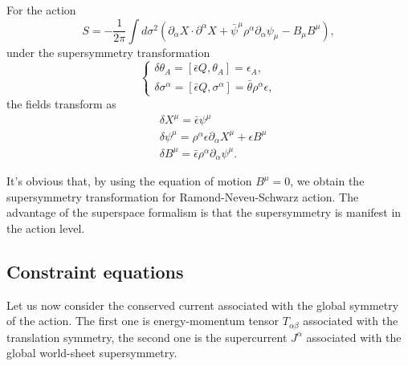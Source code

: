 \documentclass[graybox,envcountchap,sectrefs]{svmono}
\begin{document}
\begin{svgraybox}
For the action
\begin{equation}
S=-\frac{1}{2\pi}\int d\sigma^2 (\partial_{\alpha}X\cdot \partial^{\alpha}X+\bar{\psi}^{\mu}\rho^{\alpha}\partial_{\alpha}\psi_{\mu}-B_{\mu}B^{\mu}),
\end{equation}
under the supersymmetry transformation
\begin{equation}
	\begin{cases}
\delta\theta_A =[\bar{\epsilon}Q,\theta_A]=\epsilon_A, \\
\delta \sigma^{\alpha}=[\bar{\epsilon}Q,\sigma^{\alpha}]=\bar{\theta}\rho^{\alpha}\epsilon,
   \end{cases}
\end{equation}
the fields transform as
\begin{align}
&\delta X^{\mu}=\bar{\epsilon}\psi^{\mu}\\
&\delta \psi^{\mu}=\rho^{\alpha}\epsilon\partial_{\alpha}X^{\mu}+\epsilon B^{\mu}\\
&\delta B^{\mu}=\bar{\epsilon}\rho^{\alpha}\partial_{\alpha}\psi^{\mu}.
\end{align}	
\end{svgraybox}
It's obvious that, by using the equation of motion $B^{\mu}=0$, we obtain the supersymmetry transformation for Ramond-Neveu-Schwarz action. The advantage of the superspace formalism is that the supersymmetry is manifest in the action level.

\subsection{Constraint equations}

Let us now consider the conserved current associated with the global symmetry of the action.
The first one is energy-momentum tensor $T_{\alpha\beta}$ associated with the translation symmetry, the second one is the supercurrent $J^{\alpha}$  associated with the global world-sheet supersymmetry.
\end{document}

